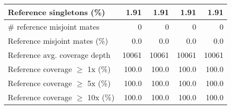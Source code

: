 \documentclass[12pt,a4paper]{article}
\begin{document}
\begin{table}[ht]
\begin{center}
\begin{tabular}{|l*{4}{|r}|}
Reference singletons (\%) & 1.91 & 1.91 & 1.91 & 1.91 \\ \hline
\# reference misjoint mates & 0 & 0 & 0 & 0 \\ \hline
Reference misjoint mates (\%) & 0.0 & 0.0 & 0.0 & 0.0 \\ \hline
Reference avg. coverage depth & 10061 & 10061 & 10061 & 10061 \\ \hline
Reference coverage $\geq$ 1x (\%) & 100.0 & 100.0 & 100.0 & 100.0 \\ \hline
Reference coverage $\geq$ 5x (\%) & 100.0 & 100.0 & 100.0 & 100.0 \\ \hline
Reference coverage $\geq$ 10x (\%) & 100.0 & 100.0 & 100.0 & 100.0 \\ \hline
\end{tabular}
\end{center}
\end{table}
\end{document}
